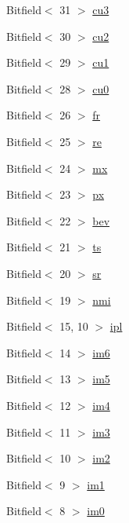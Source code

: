 \begin{DoxyCompactItemize}
Bitfield$<$ 31 $>$ \hyperlink{namespaceMipsISA_a99e7ebb11ddd9bbc81849ed24c080513}{cu3}
\item 
Bitfield$<$ 30 $>$ \hyperlink{namespaceMipsISA_adfff23da565dd35a06804569d19b5dc1}{cu2}
\item 
Bitfield$<$ 29 $>$ \hyperlink{namespaceMipsISA_abb5a9dedaa64ff05f735343b0bcfcc4f}{cu1}
\item 
Bitfield$<$ 28 $>$ \hyperlink{namespaceMipsISA_ab713e9ce578f5962abb2adcd643965d4}{cu0}
\item 
Bitfield$<$ 26 $>$ \hyperlink{namespaceMipsISA_a7943db9a4d094cbf5760f498bc9b5160}{fr}
\item 
Bitfield$<$ 25 $>$ \hyperlink{namespaceMipsISA_af8a6bf3683305fd49fbfa92b04ddf067}{re}
\item 
Bitfield$<$ 24 $>$ \hyperlink{namespaceMipsISA_af0f400a7e187739352fb79b272180aaa}{mx}
\item 
Bitfield$<$ 23 $>$ \hyperlink{namespaceMipsISA_a400b407a16ccdb09fc5a8b060c70c344}{px}
\item 
Bitfield$<$ 22 $>$ \hyperlink{namespaceMipsISA_affd215a04d9abd4d37718b19c83b79d1}{bev}
\item 
Bitfield$<$ 21 $>$ \hyperlink{namespaceMipsISA_a50fc899bd84a44263a9de45feb70b447}{ts}
\item 
Bitfield$<$ 20 $>$ \hyperlink{namespaceMipsISA_a1374386b07e211f084f2b05684c784c7}{sr}
\item 
Bitfield$<$ 19 $>$ \hyperlink{namespaceMipsISA_a10d5955b9c41093bf6f97f63f8372fc6}{nmi}
\item 
Bitfield$<$ 15, 10 $>$ \hyperlink{namespaceMipsISA_a293972dea342ee9036f13ec25bc9c278}{ipl}
\item 
Bitfield$<$ 14 $>$ \hyperlink{namespaceMipsISA_a13eb87dee805523d16ace6099d546e9c}{im6}
\item 
Bitfield$<$ 13 $>$ \hyperlink{namespaceMipsISA_af9f19c0f7b99aa12ada6264f4ad9c7bd}{im5}
\item 
Bitfield$<$ 12 $>$ \hyperlink{namespaceMipsISA_a511ef66f620f8c7842874f8a7aeb4fc7}{im4}
\item 
Bitfield$<$ 11 $>$ \hyperlink{namespaceMipsISA_a350a6f9fa450babe169b64e98d87b51e}{im3}
\item 
Bitfield$<$ 10 $>$ \hyperlink{namespaceMipsISA_a7d263bc9d256faa120ad79525e720a9b}{im2}
\item 
Bitfield$<$ 9 $>$ \hyperlink{namespaceMipsISA_a98fda461fc677725627ef8db69a4f194}{im1}
\item 
Bitfield$<$ 8 $>$ \hyperlink{namespaceMipsISA_aa1b229c50ce90789d1c4526fdbdb695d}{im0}

\end{DoxyCompactItemize}
